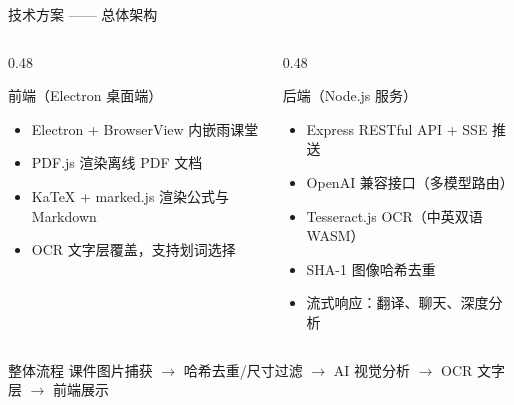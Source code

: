 \documentclass[aspectratio=169]{beamer}
\begin{document}
\begin{frame}{技术方案 —— 总体架构}
  \begin{columns}[T]
    \begin{column}{0.48\textwidth}
      \begin{block}{前端（Electron 桌面端）}
        \begin{itemize}
          \item Electron + BrowserView 内嵌雨课堂
          \item PDF.js 渲染离线 PDF 文档
          \item KaTeX + marked.js 渲染公式与 Markdown
          \item OCR 文字层覆盖，支持划词选择
        \end{itemize}
      \end{block}
    \end{column}
    \begin{column}{0.48\textwidth}
      \begin{block}{后端（Node.js 服务）}
        \begin{itemize}
          \item Express RESTful API + SSE 推送
          \item OpenAI 兼容接口（多模型路由）
          \item Tesseract.js OCR（中英双语 WASM）
          \item SHA-1 图像哈希去重
          \item 流式响应：翻译、聊天、深度分析
        \end{itemize}
      \end{block}
    \end{column}
  \end{columns}

  \vspace{0.4cm}
  \begin{block}{整体流程}
    课件图片捕获 $\rightarrow$ 哈希去重/尺寸过滤 $\rightarrow$ AI 视觉分析 $\rightarrow$ OCR 文字层 $\rightarrow$ 前端展示
  \end{block}
\end{frame}
\end{document}
